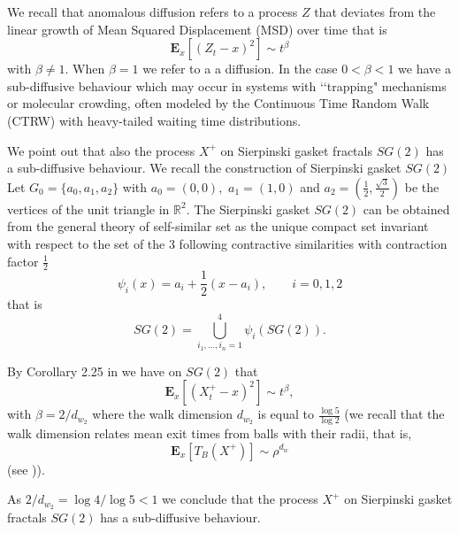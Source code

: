 \documentclass[[11pt,a4paper,reqno]{article}
\newcommand{\R}{{\mathbb R}}
\numberwithin{equation}{section}
\begin{document}
We recall that anomalous diffusion refers to a  process $Z$ that deviates from the linear growth of Mean Squared Displacement (MSD) over time that is  $$\mathbf{E}_x[(Z_t-x)^2] \sim  t^\beta$$ with $\beta\neq1.$
When $\beta=1$ we refer to a  a diffusion. In the case $0 < \beta < 1$ we have a sub-diffusive behaviour which may occur in systems with \lq\lq trapping" mechanisms or molecular crowding, often modeled by the Continuous Time Random Walk (CTRW) with heavy-tailed waiting time distributions.


We point out that also the process $X^+$ on Sierpinski gasket fractals $SG(2)$ has a sub-diffusive behaviour.
We recall the construction of  Sierpinski gasket $SG(2)$
Let $G_0 =\{a_0, a_1, a_2\} $  with $a_0=(0, 0),$ $ a_1=(1, 0)$ and $ a_2= (\frac12,\frac{\sqrt{3}}2)$   be the vertices of the unit
 triangle in $\R^2.$ 
The Sierpinski gasket  $SG(2)$ can be obtained from the general  theory of self-similar set as 
the unique compact set invariant with respect to the set of  the $3$ following contractive similarities with contraction factor $\frac12$
$$\psi_i(x)=a_i +\frac12(x-a_i), \quad\quad i=0,1, 2$$ 
that is $$SG(2)= \bigcup_{i_1,...,i_n=1}^4 \psi_i (SG(2)).$$




By Corollary 2.25 in \cite{BAR} we have on  $SG(2)$ that  $$\mathbf{E}_x[(X^+_t-x)^2] \sim  t^\beta,$$  with $\beta=2/d_{w_2}$ where the  walk dimension $d_{w_2}$  is   equal to  $\frac{ \log 5}{ \log 2}$
(we recall that  the  walk dimension relates mean exit times from balls with their radii,  that is, $$\mathbf{E}_x[T_B(X^+)] \sim \rho^{d_w}$$ (see \cite{BAR})).


As $2/d_{w_2} = \log 4/ \log 5 < 1$ we  conclude that the process $X^+$ on Sierpinski gasket fractals $SG(2)$ has a sub-diffusive behaviour.
\end{document}
